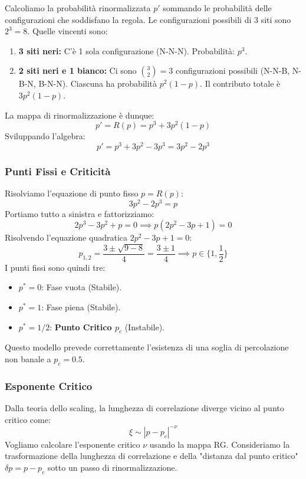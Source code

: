 Calcoliamo la probabilità rinormalizzata $p'$ sommando le probabilità delle configurazioni che soddisfano la regola.
Le configurazioni possibili di 3 siti sono $2^3 = 8$. Quelle vincenti sono:
\begin{enumerate}
    \item \textbf{3 siti neri:} C'è 1 sola configurazione (N-N-N). Probabilità: $p^3$.
    \item \textbf{2 siti neri e 1 bianco:} Ci sono $\binom{3}{2} = 3$ configurazioni possibili (N-N-B, N-B-N, B-N-N). Ciascuna ha probabilità $p^2(1-p)$. Il contributo totale è $3p^2(1-p)$.
\end{enumerate}

La mappa di rinormalizzazione è dunque:
\begin{equation}
    p' = R(p) = p^3 + 3p^2(1-p)
\end{equation}
Sviluppando l'algebra:
\begin{equation}
    p' = p^3 + 3p^2 - 3p^3 = 3p^2 - 2p^3
\end{equation}

\subsubsection{Punti Fissi e Criticità}
Risolviamo l'equazione di punto fisso $p = R(p)$:
\begin{equation}
    3p^2 - 2p^3 = p
\end{equation}
Portiamo tutto a sinistra e fattorizziamo:
\begin{equation}
    2p^3 - 3p^2 + p = 0 \implies p(2p^2 - 3p + 1) = 0
\end{equation}
Risolvendo l'equazione quadratica $2p^2 - 3p + 1 = 0$:
\begin{equation}
    p_{1,2} = \frac{3 \pm \sqrt{9 - 8}}{4} = \frac{3 \pm 1}{4} \implies p \in \{1, \frac{1}{2}\}
\end{equation}
I punti fissi sono quindi tre:
\begin{itemize}
    \item $p^* = 0$: Fase vuota (Stabile).
    \item $p^* = 1$: Fase piena (Stabile).
    \item $p^* = 1/2$: \textbf{Punto Critico $p_c$} (Instabile).
\end{itemize}
Questo modello prevede correttamente l'esistenza di una soglia di percolazione non banale a $p_c = 0.5$.

\subsubsection{Esponente Critico}
Dalla teoria dello scaling, la lunghezza di correlazione diverge vicino al punto critico come:
\begin{equation}
    \xi \sim |p - p_c|^{-\nu}
\end{equation}
Vogliamo calcolare l'esponente critico $\nu$ usando la mappa RG.
Consideriamo la trasformazione della lunghezza di correlazione e della "distanza dal punto critico" $\delta p = p - p_c$ sotto un passo di rinormalizzazione.

